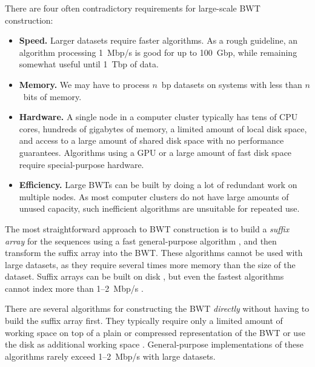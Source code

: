 \documentclass[smallabstract,smallcaptions]{dccpaper}
\newcommand{\BWT}{\textsf{BWT}}
\begin{document}
There are four often contradictory requirements for large-scale \BWT{} construction:
\begin{itemize}

\item \textbf{Speed.} Larger datasets require faster algorithms. As a rough guideline, an algorithm processing 1~Mbp/s is good for up to 100~Gbp, while remaining somewhat useful until 1~Tbp of data.

\item \textbf{Memory.} We may have to process $n$~bp datasets on systems with less than $n$~bits of memory.

\item \textbf{Hardware.} A single node in a computer cluster typically has tens of CPU cores, hundreds of gigabytes of memory, a limited amount of local disk space, and access to a large amount of shared disk space with no performance guarantees. Algorithms using a GPU or a large amount of fast disk space require special-purpose hardware.

\item \textbf{Efficiency.} Large \BWT{}s can be built by doing a lot of redundant work on multiple nodes. As most computer clusters do not have large amounts of unused capacity, such inefficient algorithms are unsuitable for repeated use.

\end{itemize}

The most straightforward approach to \BWT{} construction is to build a \emph{suffix array} for the sequences using a fast general-purpose algorithm \cite{Mori2008,Nong2011}, and then transform the suffix array into the \BWT. These algorithms cannot be used with large datasets, as they require several times more memory than the size of the dataset. Suffix arrays can be built on disk \cite{Gonnet1992}, but even the fastest algorithms cannot index more than 1\nobreakdash--2~Mbp/s \cite{Bingmann2013,Kaerkkaeinen2014a,Nong2014,Kaerkkaeinen2015a}.

There are several algorithms for constructing the \BWT{} \emph{directly} without having to build the suffix array first. They typically require only a limited amount of working space on top of a plain or compressed representation of the \BWT{} \cite{Hon2007,Kaerkkaeinen2007,Siren2009,Okanohara2009} or use the disk as additional working space \cite{Ferragina2012,Beller2013}. General-purpose implementations of these algorithms rarely exceed 1\nobreakdash--2~Mbp/s with large datasets.
\end{document}
